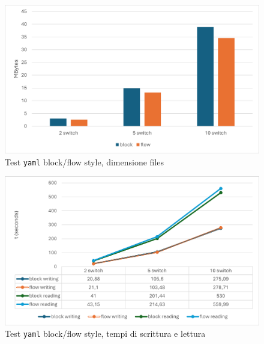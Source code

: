 \documentclass[binding=0.6cm]{sapthesis}
\begin{document}
\begin{figure}[h]
    \centering
    \includegraphics[width=1\textwidth]{immagini/yaml_block_flow_dim.png}
    \caption{Test \texttt{yaml} block/flow style, dimensione files}
    \label{fig:yaml_block_flow_dim}
\end{figure}

\begin{figure}[h]
    \centering
    \includegraphics[width=1\textwidth]{immagini/yaml_block_flow_wr.png}
    \caption{Test \texttt{yaml} block/flow style, tempi di scrittura e lettura}
    \label{fig:yaml_block_flow_wr}
\end{figure}
\end{document}
